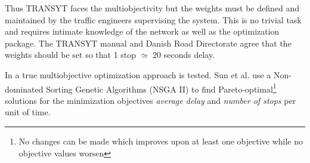 Thus TRANSYT faces the multiobjectivity but the weights must be defined and maintained by the traffic engineers supervising the system. This is no trivial task and requires intimate knowledge of the network as well as the optimization package. The TRANSYT manual and Danish Road Directorate agree that the weights should be set so that 1 stop $\simeq$ 20 seconds delay.

In \cite{41} a true multiobjective optimization approach is tested. Sun et al. use a Non-dominated Sorting Genetic Algorithms (NSGA II) to find Pareto-optimal\footnote{No changes can be made which improves upon at least one objective while no objective values worsen} solutions for the minimization objectives \textit{average delay} and \textit{number of stops} per unit of time. 
